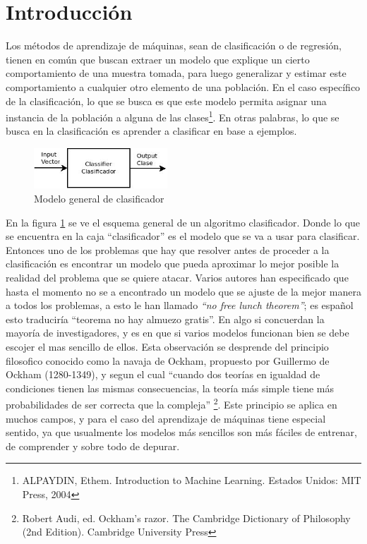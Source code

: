 \documentclass[a4paper, 11pt, oneside]{report}
\begin{document}
\section{Introducción}

Los métodos de aprendizaje de máquinas, sean de clasificación o de regresión, tienen en común que buscan extraer un modelo que explique un cierto comportamiento de una muestra tomada, para luego generalizar y estimar este comportamiento a cualquier otro elemento de una población. En el caso específico de la clasificación, lo que se busca es que este modelo permita asignar una instancia de la población a alguna de las clases\footnote{ALPAYDIN, Ethem. Introduction to Machine Learning. Estados Unidos: MIT Press, 2004}. En otras palabras, lo que se busca en la clasificación es aprender a clasificar en base a ejemplos.

\begin{figure}[htb]
\begin{center}
\leavevmode
\includegraphics[width=5cm]{diagrams/classifier1.jpg}
\end{center}
\caption{Modelo general de clasificador}
\label{fig:classif1}
\end{figure}

En la figura \ref{fig:classif1} se ve el esquema general de un algoritmo clasificador. Donde lo que se encuentra en la caja ``clasificador'' es el modelo que se va a usar para clasificar. Entonces uno de los problemas que hay que resolver antes de proceder a la clasificación es encontrar un modelo que pueda aproximar lo mejor posible la realidad del problema que se quiere atacar. Varios autores han especificado que hasta el momento no se a encontrado un modelo que se ajuste de la mejor manera a todos los problemas, a esto le han llamado {\it ``no free lunch theorem''}; es español esto traduciría ``teorema no hay almuezo gratis''. En algo si concuerdan la mayoría de investigadores, y es en que si varios modelos funcionan bien se debe escojer el mas sencillo de ellos. Esta observación se desprende del principio filosofico conocido como la navaja de Ockham, propuesto por Guillermo de Ockham (1280-1349), y segun el cual ``cuando dos teorías en igualdad de condiciones tienen las mismas consecuencias, la teoría más simple tiene más probabilidades de ser correcta que la compleja'' \footnote{Robert Audi, ed. Ockham's razor. The Cambridge Dictionary of Philosophy (2nd Edition). Cambridge University Press}. Este principio se aplica en muchos campos, y para el caso del aprendizaje de máquinas tiene especial sentido, ya que usualmente los modelos más sencillos son más fáciles de entrenar, de comprender y sobre todo de depurar.
\end{document}
